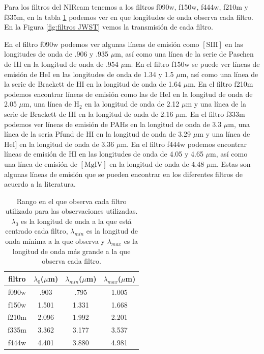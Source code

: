 \documentclass{book}
\begin{document}
Para los filtros del NIRcam  tenemos a los filtros f090w, f150w, f444w, f210m y f335m, en la tabla \ref{tab:filtros} podemos ver en que longitudes de onda observa cada filtro. En la Figura \ref{fig:filtros JWST} vemos la transmisión de cada filtro. 

En el filtro f090w podemos ver algunas líneas de emisión como $[\mathrm{S \scriptstyle{III}}]$ en las longitudes de onda de .906 y .935 $\mu$m, así como una línea de la serie de Paschen de $\mathrm{H\scriptstyle{I}}$ en la longitud de onda de .954 $\mu$m. En el filtro f150w se puede ver líneas de emisión de $\mathrm{He\scriptstyle{I}}$ en las longitudes de onda de 1.34 y 1.5 $\mu$m, así como una línea de la serie de Brackett de $\mathrm{H\scriptstyle{I}}$ en la longitud de onda de 1.64 $\mu$m. En el filtro f210m podemos encontrar líneas de emisión como las de $\mathrm{He\scriptstyle{I}}$ en la longitud de onda de 2.05 $\mu$m, una línea de $\mathrm{H_2}$ en la longitud de onda de  2.12 $\mu$m y una línea de la serie de Brackett de $\mathrm{H\scriptstyle{I}}$ en la longitud de onda de 2.16 $\mu$m. En el filtro f333m podemos ver líneas de emisión de PAHs en la longitud de onda de 3.3 $\mu$m, una línea de la seria Pfund de $\mathrm{H\scriptstyle{I}}$ en la longitud de onda de 3.29 $\mu$m y una línea de $\mathrm{He\scriptstyle{I}}]$ en la longitud de onda de 3.36 $\mu$m. En el filtro f444w podemos encontrar líneas de emisión de $\mathrm{H\scriptstyle{I}}$ en las longitudes de onda de 4.05 y 4.65 $\mu$m, así como una línea de emisión de $[\mathrm{Mg\scriptstyle{IV}}]$ en la longitud de onda de 4.48 $\mu$m. Estas son algunas líneas de emisión que se pueden encontrar en los diferentes filtros de acuerdo a la literatura. 

\begin{table}[htb]
    \centering
    \begin{tabular}{c c c c}
        \toprule
        filtro & $\lambda_0$($\mu$m) & $\lambda_{min}$($\mu$m) & $\lambda_{max}$($\mu$m) \\ 
        \midrule
         f090w & .903 & .795 & 1.005\\
         f150w &1.501 &1.331 & 1.668\\
         f210m &2.096 &1.992 & 2.201\\
         f335m &3.362 &3.177 & 3.537\\
         f444w &4.401 &3.880 & 4.981\\
         \bottomrule
    \end{tabular}
    \caption{Rango en el que observa cada filtro utilizado para las observaciones utilizadas. $\lambda_0$ es la longitud de onda a la que está centrado cada filtro, $\lambda_{min}$ es la longitud de onda mínima a la que observa y $\lambda
    _{max}$ es la longitud de onda más grande a la que observa cada filtro.}
    \label{tab:filtros}
\end{table}
\end{document}
